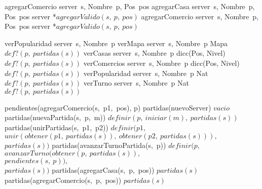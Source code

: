 \begin{tad}{}
    \tadAlinearFunciones
    {agregarComercio}
    {server\ s, Nombre\ p, Pos\ pos}
        \tadOperacion
            {agregarCasa}
            {server\ s, Nombre\ p, Pos\ pos}
            {server}
            {*$agregarValido(s,\ p,\ pos)$}
        \tadOperacion
            {agregarComercio}
            {server\ s, Nombre\ p, Pos\ pos}
            {server}
            {*$agregarValido(s,\ p,\ pos)$}
       
    \tadOtrasOperaciones
    \tadAlinearFunciones
    {verPopularidad}
    {server\ s, Nombre\ p}
        \tadOperacion
            {verMapa}
            {server\ s, Nombre\ p}
            {Mapa}
            {$def?(p,\ partidas(s))$}
        \tadOperacion
            {verCasas}
            {server\ s, Nombre\ p}
            {dicc(Pos, Nivel)}
            {$def?(p,\ partidas(s))$}        
        \tadOperacion
            {verComercios}
            {server\ s, Nombre\ p}
            {dicc(Pos, Nivel)}
            {$def?(p,\ partidas(s))$}
        \tadOperacion
            {verPopularidad}
            {server\ s, Nombre\ p}
            {Nat}
            {$def?(p,\ partidas(s))$}
        \tadOperacion
            {verTurno}
            {server\ s, Nombre\ p}
            {Nat}
            {$def?(p,\ partidas(s))$}

\vspace{3mm}
    \tadAlinearAxiomas
    {pendientes(agregarComercio(s,\ p1,\ pos), p)}
        \tadAxioma
            {partidas(nuevoServer)}
            {$vacio$}
        \tadAxioma
            {partidas(nuevaPartida(s,\ p,\ m))}
            {$definir(p,\ iniciar(m),\ partidas(s))$}
        \tadAxioma
            {partidas(unirPartidas(s,\ p1,\ p2))}
            {$definir(p1,\ $\\$ 
            $\tab$ unir(obtener(p1,\ partidas(s)),\ obtener(p2,\ partidas(s))),\ $\\$ 
            $\tab$ partidas(s))$}
        \tadAxioma
            {partidas(avanzarTurnoPartida(s,\ p))}
            {$definir(p,\ $\\$
            $\tab$ avanzarTurno(obtener(p,\ partidas(s)),\ $\\$
            $\tab\tab\tab\tab$ pendientes(s,\ p)),\ $\\$
            $\tab$ partidas(s))$}
        \tadAxioma
            {partidas(agregarCasa(s,\ p,\ pos))}
            {$partidas(s)$}
        \tadAxioma
            {partidas(agregarComercio(s,\ p,\ pos))}
            {$partidas(s)$}


\end{tad}
